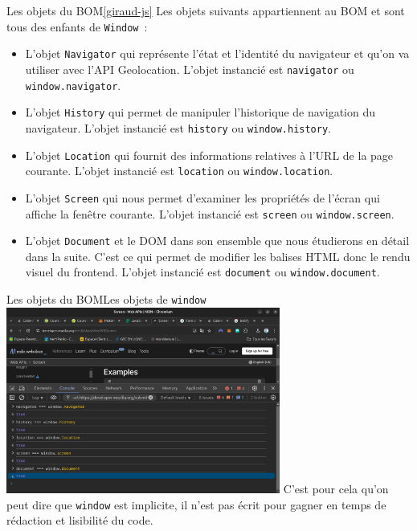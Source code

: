 \documentclass{beamer}
\begin{document}
    \begin{frame}{Les objets du BOM\cref{giraud-js}}
        Les objets suivants appartiennent au BOM et sont tous des enfants de \lstinline{Window}~:
        \begin{itemize}
            \item L’objet \lstinline{Navigator} qui représente l’état et l’identité du navigateur et qu’on va utiliser avec l’API Geolocation.
            L'objet instancié est \lstinline{navigator} ou \lstinline{window.navigator}.
            \item L’objet \lstinline{History} qui permet de manipuler l’historique de navigation du navigateur.
            L'objet instancié est \lstinline{history} ou \lstinline{window.history}.
            \item L’objet \lstinline{Location} qui fournit des informations relatives à l’URL de la page courante.
            L'objet instancié est \lstinline{location} ou \lstinline{window.location}.
            \item L’objet \lstinline{Screen} qui nous permet d’examiner les propriétés de l’écran qui affiche la fenêtre courante.
            L'objet instancié est \lstinline{screen} ou \lstinline{window.screen}.
            \item L’objet \lstinline{Document} et le DOM dans son ensemble que nous étudierons en détail dans la suite.
            C'est ce qui permet de modifier les balises HTML donc le rendu visuel du frontend.
            L'objet instancié est \lstinline{document} ou \lstinline{window.document}.
        \end{itemize}
    \end{frame}

    \begin{frame}{Les objets du BOM}{Les objets de \lstinline{window}}
        \centering
        \includegraphics[width=9cm]{image/browser-window-objects}
        \flushleft
        C'est pour cela qu'on peut dire que \lstinline{window} est implicite, il n'est pas écrit pour gagner en temps de rédaction et lisibilité du code.
    \end{frame}
\end{document}
